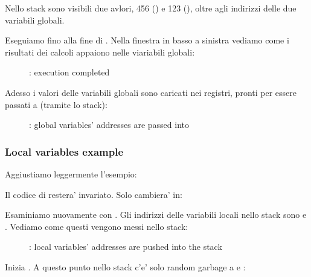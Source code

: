 Nello stack sono visibili due avlori, 456 () e
123 (), oltre agli indirizzi delle due variabili globali.

\clearpage

Eseguiamo fino alla fine di \ttfone.
Nella finestra in basso a sinistra vediamo come i risultati dei calcoli appaiono nelle viariabili globali:

\begin{figure}[H]
\centering
{}
\caption{\olly: \ttfone execution completed}
\label{fig:pointers_olly_global_3}
\end{figure}

\clearpage

Adesso i valori delle variabili globali sono caricati nei registri, pronti per essere passati a \printf (tramite lo stack):

\begin{figure}[H]
\centering
{}
\caption{\olly: 
global variables' addresses are passed into \printf}
\label{fig:pointers_olly_global_4}
\end{figure}

\subsubsection{Local variables example}

Aggiustiamo leggermente l'esempio:



Il codice di \ttfone restera' invariato.
Solo \main cambiera' in:



\clearpage
Esaminiamo nuovamente con \olly.
Gli indirizzi delle variabili locali nello stack sono  e .
Vediamo come questi vengono messi nello stack: 

\begin{figure}[H]
\centering
{}
\caption{\olly: local variables' addresses are
pushed into the stack}
\label{fig:pointers_olly_stk_1}
\end{figure}

\clearpage
Inizia \ttfone.
A questo punto nello stack c'e' solo random garbage a  e :


